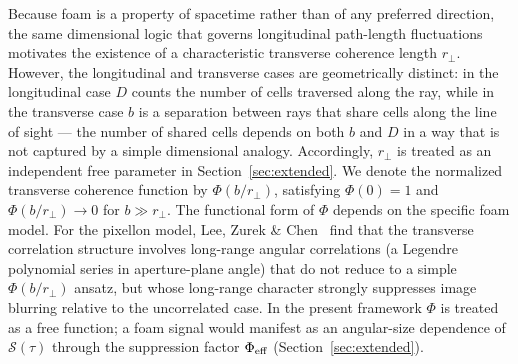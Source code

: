 \documentclass[aps,prd,onecolumn,amsmath,amssymb]{revtex4-2}
\begin{document}
Because foam is a property of spacetime rather than of any preferred direction,
the same dimensional logic that governs longitudinal path-length fluctuations
motivates the existence of a characteristic transverse coherence length $r_\perp$.
However, the longitudinal and transverse cases are geometrically distinct: in the
longitudinal case $D$ counts the number of cells traversed along the ray, while in
the transverse case $b$ is a separation between rays that share cells along the line
of sight --- the number of shared cells depends on both $b$ and $D$ in a way that is
not captured by a simple dimensional analogy.
Accordingly, $r_\perp$ is treated as an independent free parameter in
Section~\ref{sec:extended}.
We denote the normalized transverse coherence function by $\Phi(b/r_\perp)$,
satisfying $\Phi(0)=1$ and $\Phi(b/r_\perp)\to 0$ for $b\gg r_\perp$.
The functional form of $\Phi$ depends on the specific foam model.
For the pixellon model, Lee, Zurek \& Chen~\cite{LeeZurekChen2024} find that
the transverse correlation structure involves long-range angular correlations
(a Legendre polynomial series in aperture-plane angle) that do not reduce to
a simple $\Phi(b/r_\perp)$ ansatz, but whose long-range character strongly
suppresses image blurring relative to the uncorrelated case.
In the present framework $\Phi$ is treated as a free function; a foam
signal would manifest as an angular-size dependence of
$\mathcal{S}(\tau)$ through the suppression factor $\Phi_{\rm eff}$
(Section~\ref{sec:extended}).
\end{document}
